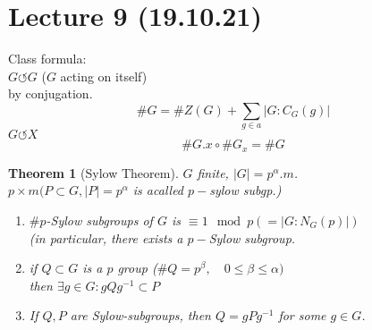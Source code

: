 \documentclass{article}
\newcommand{\abs}[1]{\left|#1\right|}
\newtheorem{theorem}{Theorem}[section]
\theoremstyle{definition}
\theoremstyle{remark}
\theoremstyle{example}
\begin{document}
		\section*{Lecture 9 (19.10.21)}
		Class formula:\\
		$G \circlearrowleft G$ ($G$ acting on itself)\\
		by conjugation.\\
		\[\#G=\#Z(G)+\sum_{g \in a} \abs{G:C_G(g)}\]
		$G \circlearrowleft X$ \[ \#G.x \circ \#G_x = \#G \]
		\begin{theorem}[Sylow Theorem]
			$G$ finite, $\abs{G}=p^\alpha.m$.\\
			$p \times m (P \subset G, \abs{P}=p^\alpha$ is acalled $p-$sylow subgp.)
			\begin{enumerate}
				\item $\#p$-Sylow subgroups of $G$ is $\equiv 1 \mod p ( = \abs{G:N_G(p)})$\\
				(in particular, there exists a $p-$Sylow subgroup.
				\item if $Q \subset G$ is a $p$ group ($\#Q=p^\beta,\quad 0 \leq \beta \leq \alpha)$\\
				then $\exists g \in G:gQg^{-1}\subset P$
				\item If $Q,P$ are Sylow-subgroups, then $Q=gPg^{-1}$ for some $g \in G$.
			\end{enumerate}
		\end{theorem}
\end{document}
